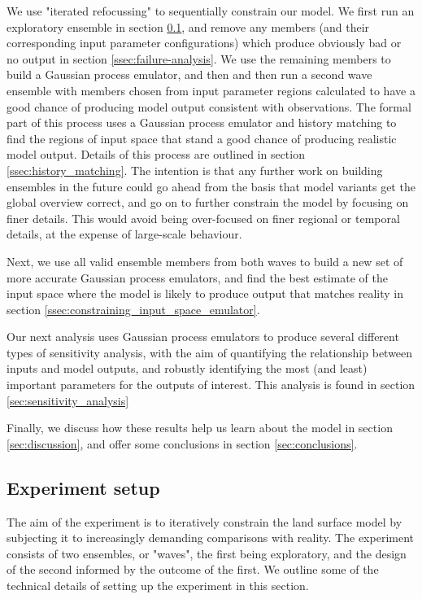 \documentclass[gmd, manuscript]{copernicus}
\begin{document}
We use "iterated refocussing" to sequentially constrain our model.  We first run an exploratory ensemble in section \ref{ssec:experiment_setup}, and remove any members (and their corresponding input parameter configurations) which produce obviously bad or no output in section \ref{ssec:failure-analysis}. We use the remaining members to build a Gaussian process emulator, and then and then run a second wave ensemble with members chosen from input parameter regions calculated to have a good chance of producing model output consistent with observations. The formal part of this process uses a Gaussian process emulator and history matching to find the regions of input space that stand a good chance of producing realistic model output. Details of this process are outlined in section \ref{ssec:history_matching}. The intention is that any further work on building ensembles in the future could go ahead from the basis that model variants get the global overview correct, and go on to further constrain the model by focusing on finer details. This would avoid being over-focused on finer regional or temporal details, at the expense of large-scale behaviour.

Next, we use all valid ensemble members from both waves to build a new set of more accurate Gaussian process emulators, and find the best estimate of the input space where the model is likely to produce output that matches reality in section \ref{ssec:constraining_input_space_emulator}.

Our next analysis uses Gaussian process emulators to produce several different types of sensitivity analysis, with the aim of quantifying the relationship between inputs and model outputs, and robustly identifying the most (and least) important parameters for the outputs of interest. This analysis is found in section \ref{sec:sensitivity_analysis}

Finally, we discuss how these results help us learn about the model in section \ref{sec:discussion}, and offer some conclusions in section \ref{sec:conclusions}.

\subsection {Experiment setup}\label{ssec:experiment_setup}

The aim of the experiment is to iteratively constrain the land surface model by subjecting it to increasingly demanding comparisons with reality. The experiment consists of two ensembles, or "waves", the first being exploratory, and the design of the second informed by the outcome of the first.  We outline some of the technical details of setting up the experiment in this section.
\end{document}
